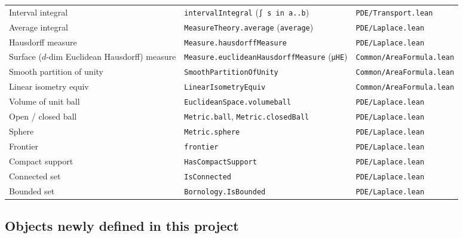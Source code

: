 ﻿\documentclass[12pt, a4paper]{article}
\renewcommand{\_}{\origunderscore\allowbreak}
\theoremstyle{definition}
\theoremstyle{plain}
\begin{document}
\begin{longtable}{@{}L{4.2cm}L{7.0cm}L{3.6cm}@{}}
  Interval integral & \texttt{intervalIntegral} (\texttt{∫ s in a..b}) & \texttt{PDE/\allowbreak Transport.\allowbreak lean} \\
  Average integral & \texttt{MeasureTheory.average} (\texttt{average}) & \texttt{PDE/\allowbreak Laplace.\allowbreak lean} \\
  Hausdorff measure & \texttt{Measure.hausdorffMeasure} & \texttt{PDE/\allowbreak Laplace.\allowbreak lean} \\
  Surface ($d$-dim Euclidean Hausdorff) measure & \texttt{Measure.euclideanHausdorffMeasure} (\texttt{μHE}) & \texttt{Common/\allowbreak AreaFormula.\allowbreak lean} \\
  Smooth partition of unity & \texttt{SmoothPartitionOfUnity} & \texttt{Common/\allowbreak AreaFormula.\allowbreak lean} \\
  Linear isometry equiv & \texttt{LinearIsometryEquiv} & \texttt{Common/\allowbreak AreaFormula.\allowbreak lean} \\
  Volume of unit ball & \texttt{EuclideanSpace.volume\_ball} & \texttt{PDE/\allowbreak Laplace.\allowbreak lean} \\
  Open / closed ball & \texttt{Metric.ball}, \texttt{Metric.closedBall} & \texttt{PDE/\allowbreak Laplace.\allowbreak lean} \\
  Sphere & \texttt{Metric.sphere} & \texttt{PDE/\allowbreak Laplace.\allowbreak lean} \\
  Frontier & \texttt{frontier} & \texttt{PDE/\allowbreak Laplace.\allowbreak lean} \\
  Compact support & \texttt{HasCompactSupport} & \texttt{PDE/\allowbreak Laplace.\allowbreak lean} \\
  Connected set & \texttt{IsConnected} & \texttt{PDE/\allowbreak Laplace.\allowbreak lean} \\
  Bounded set & \texttt{Bornology.IsBounded} & \texttt{PDE/\allowbreak Laplace.\allowbreak lean} \\
  \bottomrule
\end{longtable}

\subsection{Objects newly defined in this project}
\end{document}
